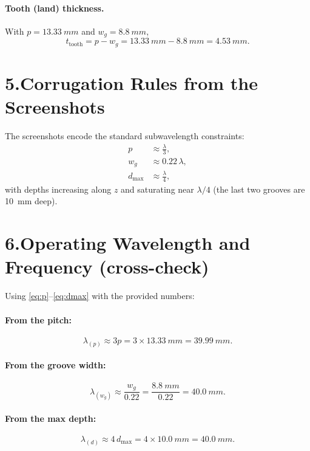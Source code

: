\documentclass[11pt]{article}
\begin{document}
\paragraph{Tooth (land) thickness.} With $p=\SI{13.33}{mm}$ and $w_g=\SI{8.8}{mm}$,
\begin{equation}
t_{\text{tooth}}=p-w_g=\SI{13.33}{mm}-\SI{8.8}{mm}=\SI{4.53}{mm}.
\end{equation}

\section*{5.\quad Corrugation Rules from the Screenshots}
The screenshots encode the standard subwavelength constraints:
\begin{align}
p &\approx \frac{\lambda}{3},\label{eq:p}\\
w_g &\approx 0.22\,\lambda,\label{eq:wg}\\
d_{\max} &\approx \frac{\lambda}{4}, \label{eq:dmax}
\end{align}
with depths increasing along $z$ and saturating near $\lambda/4$ (the last two grooves are \SI{10}{mm} deep).

\section*{6.\quad Operating Wavelength and Frequency (cross-check)}
Using \eqref{eq:p}--\eqref{eq:dmax} with the provided numbers:

\paragraph{From the pitch:}
\begin{equation*}
\lambda_{(p)} \approx 3p = 3\times \SI{13.33}{mm} = \SI{39.99}{mm}.
\end{equation*}

\paragraph{From the groove width:}
\begin{equation*}
\lambda_{(w_g)} \approx \frac{w_g}{0.22} = \frac{\SI{8.8}{mm}}{0.22} = \SI{40.0}{mm}.
\end{equation*}

\paragraph{From the max depth:}
\begin{equation*}
\lambda_{(d)} \approx 4\,d_{\max} = 4\times \SI{10.0}{mm} = \SI{40.0}{mm}.
\end{equation*}
\end{document}
